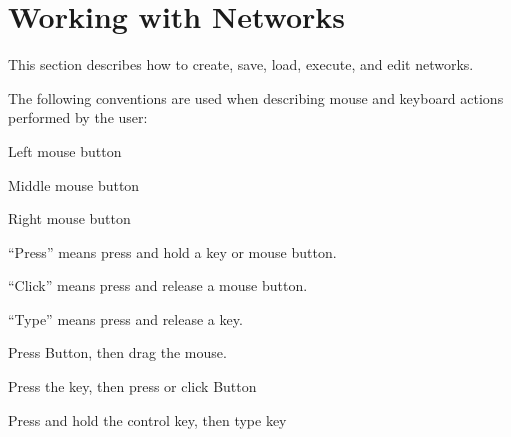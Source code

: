 %
% 
% 
% 
%  
% 
% 
%


\chapter{Working with Networks}
\label{ch:workwithnets}

This section describes how to create, save, load, execute, and edit
networks.

The following conventions are used when describing mouse and keyboard
actions performed by the user:

\begin{description}
 Left mouse button

 Middle mouse button

 Right mouse button

 ``Press'' means press and hold a key or mouse button.

 ``Click'' means press and release a mouse button.

 ``Type''  means press and release a key.

 Press Button,
then drag the mouse.

 Press the  key,
then press or click Button

 Press and hold the control key, then
type key 
\end{description}


